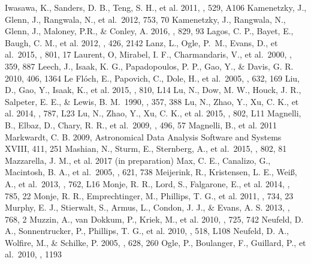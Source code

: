 \documentclass[preprint]{aastex}
\begin{document}
\begin{references}
 Iwasawa, K., Sanders, D. B., Teng, S. H., et al. 2011, \aap, 529, A106
 Kamenetzky, J., Glenn, J., Rangwala, N., et al.~2012, 753, 70
 Kamenetzky, J., Rangwala, N., Glenn, J., Maloney, P.R., \& Conley, A. 2016, \apj, 829, 93
 Lagos, C. P., Bayet, E., Baugh, C. M., et al. 2012, \mnras, 426, 2142
 Lanz, L., Ogle, P.~M., Evans, D., et al.~2015, \apj, 801, 17
 Laurent, O, Mirabel, I. F., Charmandaris, V., et al.~2000, \aap, 359, 887
 Leech, J., Isaak, K. G., Papadopoulos, P. P., Gao, Y., \& Davis, G. R. 2010, 406, 1364
 Le Fl\'och, E., Papovich, C., Dole, H., et al.~2005, \apj, 632, 169
 Liu, D., Gao, Y., Isaak, K., et al. 2015, \apj, 810, L14
 Lu, N., Dow, M. W., Houck, J. R., Salpeter, E. E., \& Lewis, B. M.~1990, \apj, 357, 388
 Lu, N., Zhao, Y., Xu, C. K., et al. 2014, \apj, 787, L23
 Lu, N., Zhao, Y., Xu, C. K., et al. 2015, \apj, 802, L11
 Magnelli, B., Elbaz, D., Chary, R. R., et al.~2009, \aap, 496, 57
 Magnelli, B., et al. 2011
 Markwardt, C. B. 2009, Astronomical Data Analysis Software and Systems XVIII, 411, 251
 Mashian, N., Sturm, E., Sternberg, A., et al.~2015, \apj, 802, 81
 Mazzarella, J. M., et al. 2017 (in preparation)
 Max, C. E., Canalizo, G., Macintosh, B. A., et al.~2005, \apj, 621, 738
 Meijerink, R., Kristensen, L. E., Wei\ss, A., et al.~2013, \apj, 762, L16
 Monje, R. R., Lord, S., Falgarone, E., et al. 2014, \apj, 785, 22
 Monje, R. R., Emprechtinger, M., Phillips, T. G., et al. 2011, \apj, 734, 23
 Murphy, E. J., Stierwalt, S., Armus, L., Condon, J. J., \& Evans, A. S. 2013, \apj, 768, 2
 Muzzin, A., van Dokkum, P., Kriek, M., et al. 2010, \apj, 725, 742
 Neufeld, D. A., Sonnentrucker, P., Phillips, T. G., et al. 2010, \aap, 518, L108
 Neufeld, D. A., Wolfire, M., \& Schilke, P. 2005, \apj, 628, 260
 Ogle, P., Boulanger, F., Guillard, P., et al.~2010, \apj, 1193

\end{references}
\end{document}
